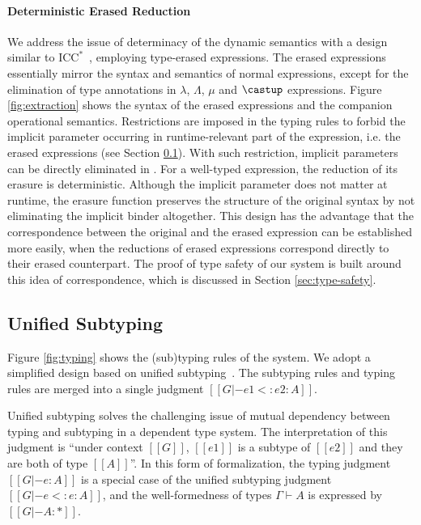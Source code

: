 \paragraph{Deterministic Erased Reduction}
We address the issue of determinacy of the dynamic semantics with
a design similar to $\mathrm{ICC}^*$~\citep{barras2008implicit},
employing type-erased expressions. The erased expressions
essentially mirror the syntax and semantics
of normal expressions, except for the elimination of type annotations in $\lambda$,
$\Lambda$, $\mu$ and $\castup$ expressions.
Figure \ref{fig:extraction} shows the syntax of the erased expressions and
the companion operational semantics. Restrictions are imposed in the
typing rules to forbid the implicit parameter occurring in runtime-relevant part
of the expression, i.e. the erased expressions (see Section \ref{sec:type-system}).
With such restriction, implicit parameters can be directly eliminated in
.
For a well-typed expression, the reduction of
its erasure is deterministic.
Although the implicit parameter does not matter at runtime, the erasure
function preserves the structure of the original syntax
by not eliminating the implicit binder altogether. This design
has the advantage that the correspondence
between the original and the erased expression can be established more easily,
when the reductions of erased expressions correspond directly to their erased counterpart.
The proof of type safety of our system is built around this idea of correspondence,
which is discussed in Section \ref{sec:type-safety}.

\subsection{Unified Subtyping}
\label{sec:type-system}

Figure \ref{fig:typing} shows the (sub)typing rules of the system. We adopt a
simplified design based on unified subtyping~\citep{full}. The subtyping rules and
typing rules are merged into a single judgment $[[G |- e1 <: e2 : A]]$.

Unified subtyping solves the challenging issue of mutual dependency between typing
and subtyping in a dependent type system.
The interpretation of this judgment is ``under context $[[G]]$, $[[e1]]$ is a
subtype of $[[e2]]$ and they are both of type $[[A]]$''.
In this form of formalization, the typing judgment $[[G |- e : A]]$ is a
special case of the unified subtyping judgment $[[G |- e <: e : A]]$,
and the well-formedness of types $\Gamma \vdash A$ is expressed by
$[[G |- A : *]]$.

